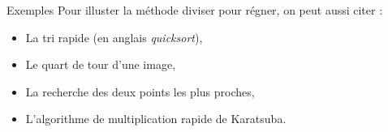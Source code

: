 \documentclass[10pt]{beamer}
\begin{document}
\begin{frame}
    \begin{exampleblock}{Exemples}
        Pour illuster la méthode diviser pour régner, on peut aussi citer :
        \begin{itemize}
            \item<2-> La tri rapide (en anglais \textit{quicksort}),
            \item<3-> Le quart de tour d'une image,
            \item<4-> La recherche des deux points les plus proches,
            \item<5-> L'algorithme de multiplication rapide de Karatsuba.
        \end{itemize}
    \end{exampleblock}   
\end{frame}
\end{document}

